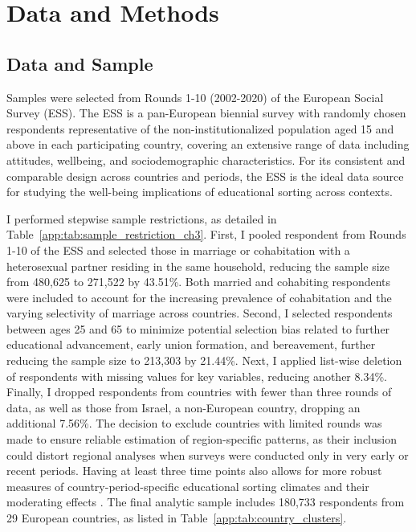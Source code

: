 \section{Data and Methods}
\label{sec:ch3-data-methods}

\subsection{Data and Sample}

Samples were selected from Rounds 1-10 (2002-2020) of the European Social Survey (ESS). The ESS is a pan-European biennial survey with randomly chosen respondents representative of the non-institutionalized population aged 15 and above in each participating country, covering an extensive range of data including attitudes, wellbeing, and sociodemographic characteristics. For its consistent and comparable design across countries and periods, the ESS is the ideal data source for studying the well-being implications of educational sorting across contexts.

I performed stepwise sample restrictions, as detailed in Table~\ref{app:tab:sample_restriction_ch3}. First, I pooled respondent from Rounds 1-10 of the ESS and selected those in marriage or cohabitation with a heterosexual partner residing in the same household, reducing the sample size from 480,625 to 271,522 by 43.51\%. Both married and cohabiting respondents were included to account for the increasing prevalence of cohabitation and the varying selectivity of marriage across countries. Second, I selected respondents between ages 25 and 65 to minimize potential selection bias related to further educational advancement, early union formation, and bereavement, further reducing the sample size to 213,303 by 21.44\%. Next, I applied list-wise deletion of respondents with missing values for key variables, reducing another 8.34\%. Finally, I dropped respondents from countries with fewer than three rounds of data, as well as those from Israel, a non-European country, dropping an additional 7.56\%. The decision to exclude countries with limited rounds was made to ensure reliable estimation of region-specific patterns, as their inclusion could distort regional analyses when surveys were conducted only in very early or recent periods. Having at least three time points also allows for more robust measures of country-period-specific educational sorting climates and their moderating effects \parencite{eratEducationalAssortativeMating2021}. The final analytic sample includes 180,733 respondents from 29 European countries, as listed in Table~\ref{app:tab:country_clusters}.

